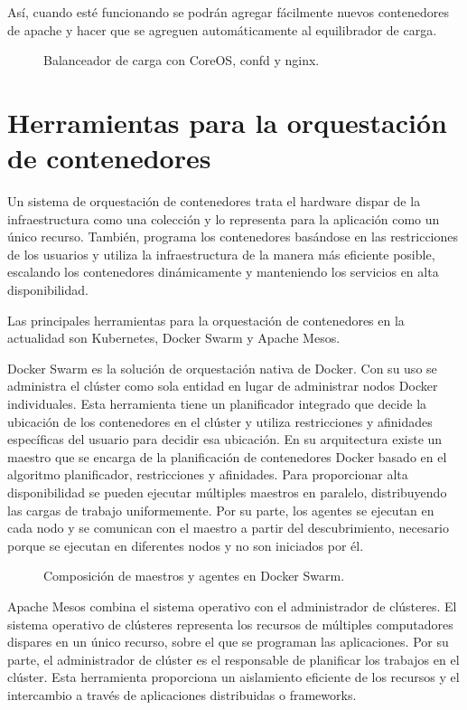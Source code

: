 Así, cuando esté funcionando se podrán agregar fácilmente nuevos contenedores de apache y hacer que se agreguen automáticamente al equilibrador de carga.

\begin{figure}[H]
\caption{Balanceador de carga con CoreOS, confd y nginx.\label{fig:figure_placement_example}}
\end{figure}

\section{Herramientas para la orquestación de contenedores}

Un sistema de orquestación de contenedores trata el hardware dispar de la infraestructura como una colección y lo representa para la aplicación como un único recurso. También, programa los contenedores basándose en las restricciones de los usuarios y utiliza la infraestructura de la manera más eficiente posible, escalando los contenedores dinámicamente y manteniendo los servicios en alta disponibilidad.

Las principales herramientas para la orquestación de contenedores en la actualidad son Kubernetes, Docker Swarm y Apache Mesos.

Docker Swarm es la solución de orquestación nativa de Docker. Con su uso se administra el clúster como sola entidad en lugar de administrar nodos Docker individuales. Esta herramienta tiene un planificador integrado que decide la ubicación de los contenedores en el clúster y utiliza restricciones y afinidades específicas del usuario para decidir esa ubicación. En su arquitectura existe un maestro que se encarga de la planificación de contenedores Docker basado en el algoritmo planificador, restricciones y afinidades. Para proporcionar alta disponibilidad se pueden ejecutar múltiples maestros en paralelo, distribuyendo las cargas de trabajo uniformemente. Por su parte, los agentes se ejecutan en cada nodo y se comunican con el maestro a partir del descubrimiento, necesario porque se ejecutan en diferentes nodos y no son iniciados por él.

\begin{figure}[H]
\caption{Composición de maestros y agentes en Docker Swarm.\label{fig:figure_placement_example}}
\end{figure}
	
Apache Mesos combina el sistema operativo con el administrador de clústeres. El sistema operativo de clústeres representa los recursos de múltiples computadores dispares en un único recurso, sobre el que se programan las aplicaciones. Por su parte, el administrador de clúster es el responsable de planificar los trabajos en el clúster. Esta herramienta proporciona un aislamiento eficiente de los recursos y el intercambio a través de aplicaciones distribuidas o frameworks.

